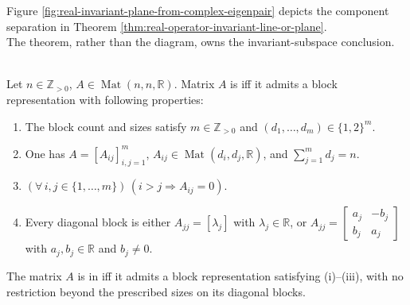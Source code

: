 Figure \ref{fig:real-invariant-plane-from-complex-eigenpair} depicts the component separation in Theorem \ref{thm:real-operator-invariant-line-or-plane}.\\
The theorem, rather than the diagram, owns the invariant-subspace conclusion.

\begin{illustrationfigure}[H]
  \centering
  
  \caption{A complex eigenpair determines a nonzero invariant real line or plane.}
  \label{fig:real-invariant-plane-from-complex-eigenpair}
\end{illustrationfigure}

\begin{definition} \label{def:almost-upper-triangular-real-matrix} \\
Let $n\in\mathbb{Z}_{>0}$, $A\in\operatorname{Mat}(n,n,\mathbb{R})$. Matrix $A$ is  iff it admits a block representation with following properties:
\begin{enumerate}[label=(\roman*)]
\setlength{\itemsep}{0pt}
\item The block count and sizes satisfy $m\in\mathbb{Z}_{>0}$ and $(d_1,\ldots,d_m)\in\{1,2\}^m$.
\item One has $A=[A_{ij}]_{i,j=1}^{m}$, $A_{ij}\in\operatorname{Mat}(d_i,d_j,\mathbb{R})$, and $\sum\limits_{j=1}^{m}d_j=n$.
\item $(\forall\,i,j\in\{1,\ldots,m\})\,(i>j\Rightarrow A_{ij}=0)$.
\item Every diagonal block is either $A_{jj}=[\lambda_j]$ with $\lambda_j\in\mathbb{R}$, or $A_{jj}=\left[\begin{smallmatrix}a_j&-b_j\\b_j&a_j\end{smallmatrix}\right]$ with $a_j,b_j\in\mathbb{R}$ and $b_j\neq0$.
\end{enumerate}
The matrix $A$ is in  iff it admits a block representation satisfying (i)--(iii), with no restriction beyond the prescribed sizes on its diagonal blocks.
\end{definition}

